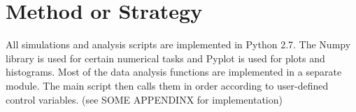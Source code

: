 


%
%

\section{Method or Strategy}
All simulations and analysis scripts are implemented in Python 2.7. The Numpy library is used for certain numerical tasks and Pyplot is used for plots and histograms. Most of the data analysis functions are implemented in a separate module. The main script then calls them in order according to user-defined control variables. (see SOME APPENDINX for implementation)

